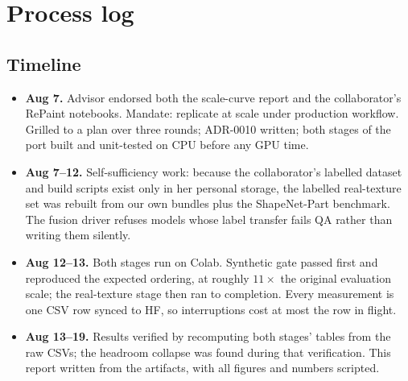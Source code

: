 \documentclass[11pt]{article}
\begin{document}
\section{Process log}\label{app:process}

\subsection*{Timeline}
\begin{itemize}
  \item \textbf{Aug 7.} Advisor endorsed both the scale-curve report and the collaborator's
  RePaint notebooks. Mandate: replicate at scale under production workflow. Grilled to a plan
  over three rounds; ADR-0010 written; both stages of the port built and unit-tested on CPU
  before any GPU time.
  \item \textbf{Aug 7--12.} Self-sufficiency work: because the collaborator's labelled dataset
  and build scripts exist only in her personal storage, the labelled real-texture set was
  rebuilt from our own bundles plus the ShapeNet-Part benchmark. The fusion driver refuses
  models whose label transfer fails QA rather than writing them silently.
  \item \textbf{Aug 12--13.} Both stages run on Colab. Synthetic gate passed first and
  reproduced the expected ordering, at roughly $11\times$ the original evaluation scale; the
  real-texture stage then ran to completion. Every measurement is one CSV row synced to HF, so
  interruptions cost at most the row in flight.
  \item \textbf{Aug 13--19.} Results verified by recomputing both stages' tables from the raw
  CSVs; the headroom collapse was found during that verification. This report written from the
  artifacts, with all figures and numbers scripted.
\end{itemize}
\end{document}
